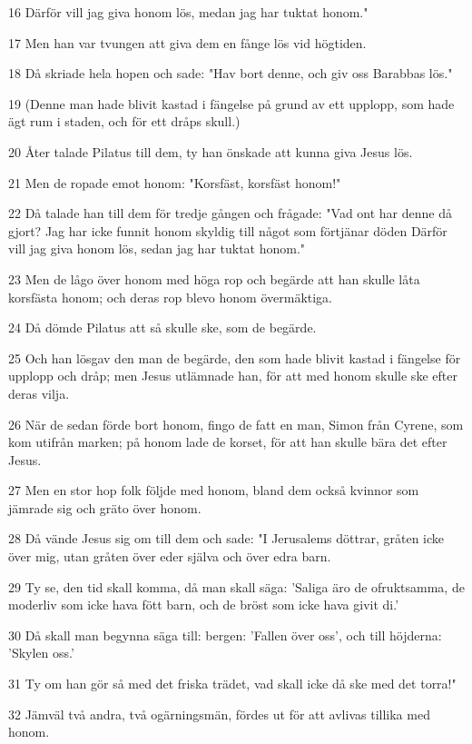 \par 16 Därför vill jag giva honom lös, medan jag har tuktat honom."
\par 17 Men han var tvungen att giva dem en fånge lös vid högtiden.
\par 18 Då skriade hela hopen och sade: "Hav bort denne, och giv oss Barabbas lös."
\par 19 (Denne man hade blivit kastad i fängelse på grund av ett upplopp, som hade ägt rum i staden, och för ett dråps skull.)
\par 20 Åter talade Pilatus till dem, ty han önskade att kunna giva Jesus lös.
\par 21 Men de ropade emot honom: "Korsfäst, korsfäst honom!"
\par 22 Då talade han till dem för tredje gången och frågade: "Vad ont har denne då gjort? Jag har icke funnit honom skyldig till något som förtjänar döden Därför vill jag giva honom lös, sedan jag har tuktat honom."
\par 23 Men de lågo över honom med höga rop och begärde att han skulle låta korsfästa honom; och deras rop blevo honom övermäktiga.
\par 24 Då dömde Pilatus att så skulle ske, som de begärde.
\par 25 Och han lösgav den man de begärde, den som hade blivit kastad i fängelse för upplopp och dråp; men Jesus utlämnade han, för att med honom skulle ske efter deras vilja.
\par 26 När de sedan förde bort honom, fingo de fatt en man, Simon från Cyrene, som kom utifrån marken; på honom lade de korset, för att han skulle bära det efter Jesus.
\par 27 Men en stor hop folk följde med honom, bland dem också kvinnor som jämrade sig och gräto över honom.
\par 28 Då vände Jesus sig om till dem och sade: "I Jerusalems döttrar, gråten icke över mig, utan gråten över eder själva och över edra barn.
\par 29 Ty se, den tid skall komma, då man skall säga: 'Saliga äro de ofruktsamma, de moderliv som icke hava fött barn, och de bröst som icke hava givit di.'
\par 30 Då skall man begynna säga till: bergen: 'Fallen över oss', och till höjderna: 'Skylen oss.'
\par 31 Ty om han gör så med det friska trädet, vad skall icke då ske med det torra!"
\par 32 Jämväl två andra, två ogärningsmän, fördes ut för att avlivas tillika med honom.
